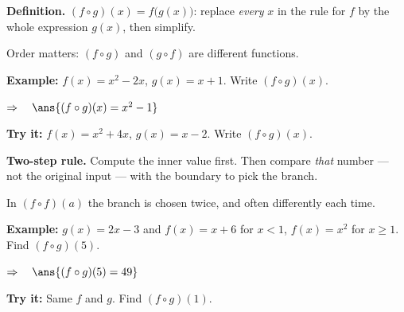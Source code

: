 \documentclass[12pt]{article}
\begin{document}


\begin{formulabox}
\textbf{Definition.} $(f \circ g)(x) = f\bigl(g(x)\bigr)$: replace \emph{every} $x$ in the rule for $f$ by the whole expression $g(x)$, then simplify.\par
Order matters: $(f \circ g)$ and $(g \circ f)$ are different functions.
\end{formulabox}

\begin{examplebox}
\textbf{Example:} \quad $f(x) = x^{2} - 2x$, $g(x) = x + 1$. Write $(f \circ g)(x)$.

$\Rightarrow\quad \ans{(f \circ g)(x) = x^{2} - 1}$
\end{examplebox}

\begin{tryitbox}
\textbf{Try it:} \quad $f(x) = x^{2} + 4x$, $g(x) = x - 2$. Write $(f \circ g)(x)$.\\[2pt]
\end{tryitbox}


\begin{formulabox}
\textbf{Two-step rule.} Compute the inner value first. Then compare \emph{that} number --- not the original input --- with the boundary to pick the branch.\par
In $(f \circ f)(a)$ the branch is chosen twice, and often differently each time.
\end{formulabox}

\begin{examplebox}
\textbf{Example:} \quad $g(x) = 2x - 3$ and $f(x) = x + 6$ for $x < 1$, $f(x) = x^{2}$ for $x \geq 1$. Find $(f \circ g)(5)$.

$\Rightarrow\quad \ans{(f \circ g)(5) = 49}$
\end{examplebox}

\begin{tryitbox}
\textbf{Try it:} \quad Same $f$ and $g$. Find $(f \circ g)(1)$.\\[2pt]
\end{tryitbox}
\end{document}
